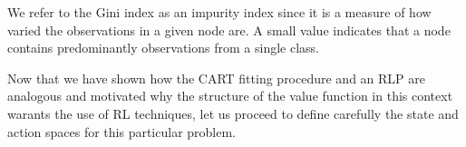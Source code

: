 We refer to the Gini index as an impurity index since it is a measure of how
varied the observations in a given node are. A small value indicates that a node
contains predominantly observations from a single class.



Now that we have shown how the CART fitting procedure and an RLP are analogous
and motivated why the structure of the value function in this context warants
the use of RL techniques, let us proceed to define carefully the state and
action spaces for this particular problem.

